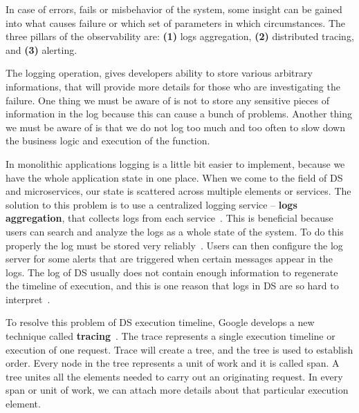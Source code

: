 In case of errors, fails or misbehavior of the system, some insight can be gained into what causes failure or which set of parameters in which circumstances. The three pillars of the observability are: \textbf{(1)} logs aggregation, \textbf{(2)} distributed tracing, and \textbf{(3)} alerting.

The logging operation, gives developers ability to store various arbitrary informations, that will provide more details for those who are investigating the failure. One thing we must be aware of is not to store any sensitive pieces of information in the log because this can cause a bunch of problems. Another thing we must be aware of is that we do not log too much and too often to slow down the business logic and execution of the function.

In monolithic applications logging is a little bit easier to implement, because we have the whole application state in one place. When we come to the field of DS and microservices, our state is scattered across multiple elements or services. The solution to this problem is to use a centralized logging service -- \textbf{logs aggregation}, that collects logs from each service~\cite{BeschastnikhWBE16}. This is beneficial because users can search and analyze the logs as a whole state of the system. To do this properly the log must be stored very reliably~\cite{DanielsST87}. Users can then configure the log server for some alerts that are triggered when certain messages appear in the logs. The log of DS usually does not contain enough information to regenerate the timeline of execution, and this is one reason that logs in DS are so hard to interpret~\cite{BeschastnikhWBE16}.

To resolve this problem of DS execution timeline, Google develops a new technique called \textbf{tracing}~\cite{36356}. The trace represents a single execution timeline or execution of one request. Trace will create a tree, and the tree is used to establish order. Every node in the tree represents a unit of work and it is called span. A tree unites all the elements needed to carry out an originating request. In every span or unit of work, we can attach more details about that particular execution element. 



